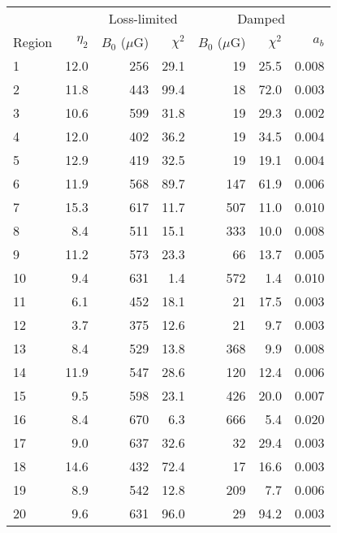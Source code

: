 \begin{tabular}{@{} l rrr rrr @{}}
\toprule
{} & {}
   & \multicolumn{2}{c}{Loss-limited}
   & \multicolumn{3}{c}{Damped} \\
\cmidrule(lr){3-4} \cmidrule(l){5-7}
Region & $\eta_2$
       & $B_0$ ($\mu$G) & $\chi^2$
       & $B_0$ ($\mu$G) & $\chi^2$ & $a_b$ \\
\midrule
 1 & 12.0 & 256 & 29.1 &  19 & 25.5 & 0.008 \\
 2 & 11.8 & 443 & 99.4 &  18 & 72.0 & 0.003 \\
 3 & 10.6 & 599 & 31.8 &  19 & 29.3 & 0.002 \\
\cmidrule{1-6}
 4 & 12.0 & 402 & 36.2 &  19 & 34.5 & 0.004 \\
 5 & 12.9 & 419 & 32.5 &  19 & 19.1 & 0.004 \\
 6 & 11.9 & 568 & 89.7 & 147 & 61.9 & 0.006 \\
 7 & 15.3 & 617 & 11.7 & 507 & 11.0 & 0.010 \\
 8 & 8.4  & 511 & 15.1 & 333 & 10.0 & 0.008 \\
 9 & 11.2 & 573 & 23.3 &  66 & 13.7 & 0.005 \\
10 & 9.4  & 631 &  1.4 & 572 &  1.4 & 0.010 \\
\cmidrule{1-6}
11 & 6.1  & 452 & 18.1 &  21 & 17.5 & 0.003 \\
12 & 3.7  & 375 & 12.6 &  21 &  9.7 & 0.003 \\
13 & 8.4  & 529 & 13.8 & 368 &  9.9 & 0.008 \\
\cmidrule{1-6}
14 & 11.9 & 547 & 28.6 & 120 & 12.4 & 0.006 \\
15 & 9.5  & 598 & 23.1 & 426 & 20.0 & 0.007 \\
16 & 8.4  & 670 &  6.3 & 666 &  5.4 & 0.020 \\
17 & 9.0  & 637 & 32.6 &  32 & 29.4 & 0.003 \\
\cmidrule{1-6}
18 & 14.6 & 432 & 72.4 &  17 & 16.6 & 0.003 \\
19 & 8.9  & 542 & 12.8 & 209 &  7.7 & 0.006 \\
20 & 9.6  & 631 & 96.0 &  29 & 94.2 & 0.003 \\
\bottomrule
\end{tabular}



